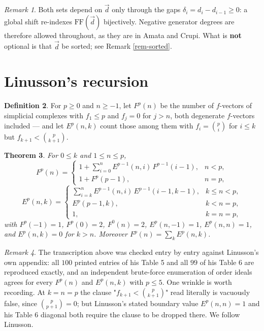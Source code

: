 \documentclass[11pt, a4paper, abstract=yes]{scrartcl}
\theoremstyle{definition}
\newtheorem{definition}{Definition}
\theoremstyle{remark}
\newtheorem{remark}[definition]{Remark}
\theoremstyle{plain}
\newtheorem{theorem}[definition]{Theorem}
\begin{document}
\begin{remark}
Both sets depend on \(\vec d\) only through the gaps \(\delta_i=d_i-d_{i-1}\ge0\): a global shift
re-indexes \(\mathrm{FF}(\vec d)\) bijectively. Negative generator degrees are therefore allowed
throughout, as they are in Amata and Crupi. What is \textbf{not} optional is that \(\vec d\) be sorted; see
Remark \ref{rem-sorted}.
\label{rem-shift-only-gaps}
\end{remark}
\section{Linusson's recursion}
\label{sec-linusson}
\begin{definition}
\textcite[\S5]{Linusson1999} For \(p\ge0\) and \(n\ge-1\), let \(F^p(n)\) be the number of \(f\)-vectors of
simplicial complexes with \(f_1\le p\) and \(f_j=0\) for \(j>n\), both degenerate \(f\)-vectors
included --- and let \(E^p(n,k)\) count those among them with \(f_i=\binom pi\) for \(i\le k\) but
\(f_{k+1}<\binom p{k+1}\).
\label{def-linusson}
\end{definition}

\begin{theorem}
\textcite[Theorem 5.2]{Linusson1999} For \(0\le k\) and \(1\le n\le p\),
\begin{equation}\label{eq:auto-8}
  F^p(n)=\begin{cases}
    1+\sum_{i=0}^{n}E^{p-1}(n,i)\,F^{p-1}(i-1), & n<p,\\
    1+F^p(p-1), & n=p,
  \end{cases}
\end{equation}
\begin{equation}\label{eq:auto-9}
  E^p(n,k)=\begin{cases}
    \sum_{i=k}^{n}E^{p-1}(n,i)\,E^{p-1}(i-1,k-1), & k\le n<p,\\
    E^p(p-1,k), & k<n=p,\\
    1, & k=n=p,
  \end{cases}
\end{equation}
with \(F^p(-1)=1\), \(F^p(0)=2\), \(F^0(n)=2\), \(E^p(n,-1)=1\), \(E^p(n,n)=1\), and
\(E^p(n,k)=0\) for \(k>n\). Moreover \(F^p(n)=\sum_kE^p(n,k)\).
\label{thm-linusson}
\end{theorem}

\begin{remark}
The transcription above was checked entry by entry against Linusson's own appendix: all \(100\)
printed entries of his Table 5 and all \(99\) of his Table 6 are reproduced exactly, and an
independent brute-force enumeration of order ideals agrees for every \(F^p(n)\) and
\(E^p(n,k)\) with \(p\le5\). One wrinkle is worth recording. At \(k=n=p\) the clause
"\(f_{k+1}<\binom p{k+1}\)" read literally is vacuously false, since \(\binom p{p+1}=0\); but
Linusson's stated boundary value \(E^p(n,n)=1\) and his Table 6 diagonal both require the clause to
be dropped there. We follow Linusson.
\label{rem-transcription}
\end{remark}
\end{document}
